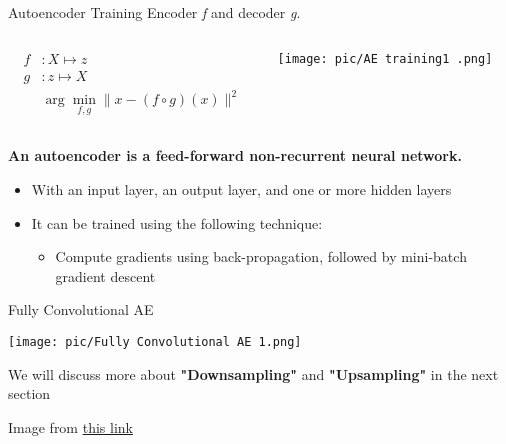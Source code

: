 \documentclass[serif, aspectratio=169]{beamer}
\begin{document}
\begin{frame}{Autoencoder Training }
    Encoder \textcolor{deepblue}{\textit{f}} and decoder \textcolor{deepblue}{\textit{g}}.    
    \begin{columns}
        \begin{column}{0.5\textwidth}
            \begin{align*}
                f &: X \mapsto z \\
                g &: z \mapsto X \\
                & \arg\min_{f, g} \| x - (f \circ g)(x) \|^2
            \end{align*}
        \end{column}
        \begin{column}{0.7\textwidth}
            \texttt{[image: pic/AE training1 .png]}
        \end{column}
    \end{columns}

    \vspace{0.5cm}
    
    \textbf{An autoencoder is a feed-forward non-recurrent neural network.}
    
    \begin{itemize}
        \item With an input layer, an output layer, and one or more hidden layers
        \item It can be trained using the following technique:
            \begin{itemize}
                \item Compute gradients using back-propagation, followed by mini-batch gradient descent
            \end{itemize}
    \end{itemize}
\end{frame}

\begin{frame}{Fully Convolutional AE}
    \begin{center}
        \texttt{[image: pic/Fully Convolutional AE 1.png]} 
    \end{center}
    
    \vspace{0.5cm}
    
    \begin{center}
        We will discuss more about \textbf{"Downsampling"} and \textbf{"Upsampling"} in the next section
    \end{center}
    
    \vspace{1cm}
    
    \tiny{Image from \href{https://mriquestions.com/upsampling.html}{this link}}
\end{frame}
\end{document}
